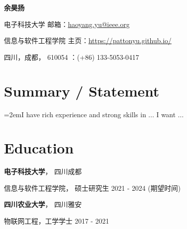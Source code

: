 \documentclass{article}
\begin{document}
\begin{center}
    \vspace*{5pt}
    \Huge{
    \textbf{余昊扬}}
\end{center}
\vspace{15pt}




\setlength{\parskip}{1pt}

\noindent 电子科技大学 \hfill 邮箱：\href{haoyang.yu@ieee.org}{haoyang.yu@ieee.org}

\noindent 信息与软件工程学院 \hfill 主页：\url{https://pattonyu.github.io/}

\noindent 四川，成都， 610054 ：(+86) 133-5053-0417

\setlength{\parskip}{3pt}




\section*{Summary / Statement}
\indent

\hangindent=2emI have rich experience and strong skills in ... I want ...


\section*{Education}
\indent 

\textbf{电子科技大学}， 四川成都

\hspace{2em}信息与软件工程学院， 硕士研究生 2021 - 2024 (期望时间)

\textbf{四川农业大学}， 四川雅安

\hspace{2em}物联网工程，工学学士 2017 - 2021







\end{document}
